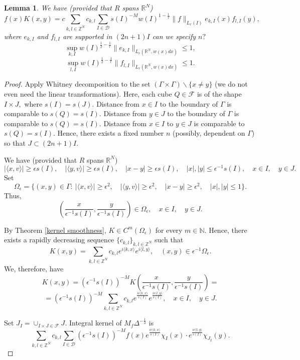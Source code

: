 \documentclass{amsart}
\newtheorem{lem}{Lemma}
\begin{document}
\begin{lem} We have (provided that $R$ spans $\mathbb{R}^N$)
$$f(x)K(x,y)=c\sum_{k,l\in\mathbb{Z}^N}c_{k,l}\sum_{I\in\mathcal{D}}s(I)^{-M}w(I)^{1-\frac1r}\|f\|_{L_r(I)}e_{k,I}(x)f_{l,I}(y),$$
where $e_{k,I}$ and $f_{l,I}$ are supported in $(2n+1)I$ {\color{red} can we specify $n?$}
$$\sup_{k,I}w(I)^{\frac12-\frac1r}\|e_{k,I}\|_{L_r(\mathbb{R}^N,w(x)dx)}\leq1,$$
$$\sup_{l,I}w(I)^{\frac12-\frac1r}\|f_{l,I}\|_{L_r(\mathbb{R}^N,w(x)dx)}\leq1.$$
\end{lem}
\begin{proof} Apply Whitney decomposition to the set $(\Gamma\times\Gamma)\backslash\{x\neq y\}$ (we do not even need the linear transformations).  Here, each cube $Q\in\mathcal{F}$ is of the shape $I\times J,$ where $s(I)=s(J).$ Distance from $x\in I$ to the boundary of $\Gamma$ is comparable to $s(Q)=s(I).$ Distance from $y\in J$ to the boundary of $\Gamma$ is comparable to $s(Q)=s(I).$ Distance from $x\in I$ to $y\in J$ is comparable to $s(Q)=s(I).$ Hence, there exists a fixed number $n$ (possibly, dependent on $\Gamma$) so that $J\subset (2n+1)I.$

We have (provided that $R$ spans $\mathbb{R}^N$)
$$|\langle x,v\rangle|\geq\epsilon s(I),\quad |\langle y,v\rangle|\geq \epsilon s(I),\quad |x-y|\geq \epsilon s(I),\quad |x|,|y|\leq\epsilon^{-1}s(I),\quad x\in I,\quad y\in J.$$ 
Set
$$\Omega_{\epsilon}=\{(x,y)\in\Gamma:\ |\langle x,v\rangle|\geq\epsilon^2,\quad |\langle y,v\rangle|\geq \epsilon^2,\quad |x-y|\geq \epsilon^2,\quad |x|,|y|\leq 1\}.$$
Thus,
$$(\frac{x}{\epsilon^{-1}s(I)},\frac{y}{\epsilon^{-1}s(I)})\in\Omega_{\epsilon},\quad x\in I,\quad y\in J.$$

By Theorem \ref{kernel smoothness}, $K\in C^m(\Omega_{\epsilon})$ for every $m\in\mathbb{N}.$ Hence, there exists a rapidly decreasing sequence $\{c_{k,l}\}_{k,l\in\mathbb{Z}^N}$ such that 
$$K(x,y)=\sum_{k,l\in\mathbb{Z}^N}c_{k,l}e^{i\langle k,x\rangle}e^{i\langle l,y\rangle},\quad (x,y)\in\epsilon^{-1}\Omega_{\epsilon}.$$
We, therefore, have
$$K(x,y)=(\epsilon^{-1}s(I))^{-M}K(\frac{x}{\epsilon^{-1}s(I)},\frac{y}{\epsilon^{-1}s(I)})=$$
$$=(\epsilon^{-1}s(I))^{-M}\sum_{k,l\in\mathbb{Z}^N}c_{k,l}e^{\frac{i\epsilon\langle k,x\rangle}{s(I)}}e^{\frac{i\epsilon\langle l,y\rangle}{s(I)}},\quad x\in I,\quad y\in J.$$

Set $J_I=\cup_{I\times J\in\mathcal{F}}J.$ Integral kernel of $M_f\Delta^{-\frac12}$ is
$$\sum_{k,l\in\mathbb{Z}^N}c_{k,l}\sum_{I\in\mathcal{D}}(\epsilon^{-1}s(I))^{-M}f(x)e^{\frac{i\epsilon\langle k,x\rangle}{s(I)}}\chi_I(x)\cdot e^{\frac{i\epsilon\langle l,y\rangle}{s(I)}}\chi_{J_I}(y).$$


\end{proof}
\end{document}
